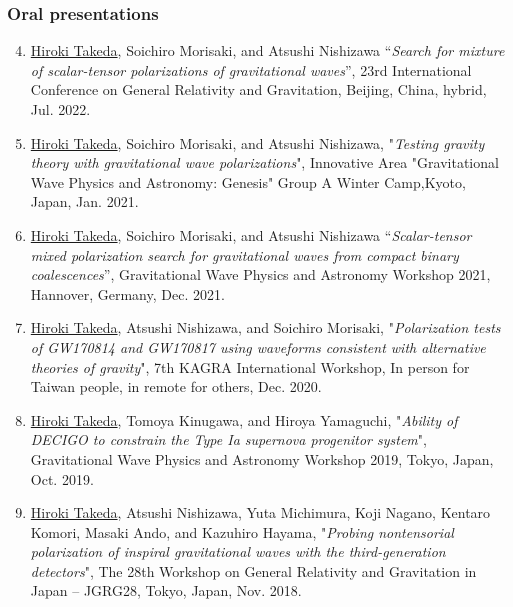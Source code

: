 \documentclass[uplatex, 12pt]{article}
\begin{document}
\subsubsection*{Oral presentations}
\begin{enumerate}
\setcounter{enumi}{3}
\item \uline{Hiroki Takeda}, Soichiro Morisaki, and Atsushi Nishizawa “\emph{Search for mixture of scalar-tensor polarizations of gravitational waves}”, 23rd International Conference on General Relativity and Gravitation, Beijing, China, hybrid, Jul. 2022.\\

\item \uline{Hiroki Takeda}, Soichiro Morisaki, and Atsushi Nishizawa,
"\emph{Testing gravity theory with gravitational wave polarizations}",
Innovative Area "Gravitational Wave Physics and Astronomy: Genesis" Group A Winter Camp,Kyoto, Japan, Jan. 2021.\\

\item \uline{Hiroki Takeda}, Soichiro Morisaki, and Atsushi Nishizawa “\emph{Scalar-tensor mixed polarization search for gravitational waves from compact binary coalescences}”, Gravitational Wave Physics and Astronomy Workshop 2021, Hannover, Germany, Dec. 2021.\\

\item \uline{Hiroki Takeda}, Atsushi Nishizawa, and Soichiro Morisaki, "\emph{Polarization tests of GW170814 and GW170817 using waveforms consistent with alternative theories of gravity}", 7th KAGRA International Workshop, In person for Taiwan people, in remote for others, Dec. 2020.\\

\item \uline{Hiroki Takeda}, Tomoya Kinugawa, and Hiroya Yamaguchi, "\emph{Ability of DECIGO to constrain the Type Ia supernova progenitor system}", Gravitational Wave Physics and Astronomy Workshop 2019, Tokyo, Japan, Oct. 2019.\\

\item \uline{Hiroki Takeda}, Atsushi Nishizawa, Yuta Michimura, Koji Nagano, Kentaro Komori, Masaki Ando, and Kazuhiro Hayama, "\emph{Probing nontensorial polarization of inspiral gravitational waves with the third-generation detectors}", The 28th Workshop on General Relativity and Gravitation in Japan – JGRG28, Tokyo, Japan, Nov. 2018.\\


\end{enumerate}
\end{document}
